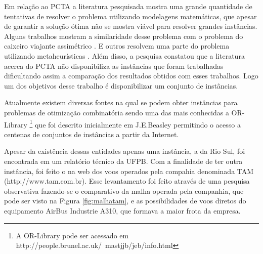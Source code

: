 Em relação ao PCTA a literatura pesquisada \cite{ahmed2009} \cite{arguelo1997}
\cite{cordeau2001} \cite{mohamed2011} \cite{abiliolivro} mostra uma grande quantidade de
tentativas de resolver o problema utilizando modelagens matemáticas, que apesar
de garantir a solução ótima não se mostra viável para resolver grandes
instâncias. Alguns trabalhos mostram a similaridade desse problema com o
problema do caixeiro viajante assimétrico \cite{clarke97}. E outros resolvem
uma parte do problema utilizando metaheurísticas \cite{arguelo1997}. Além disso,
a pesquisa constatou que a literatura acerca do PCTA não disponibiliza as
instâncias que foram trabalhadas dificultando assim a comparação dos
resultados obtidos com esses trabalhos. Logo um dos objetivos desse trabalho é
disponibilizar um conjunto de instâncias.


Atualmente existem diversas fontes na qual se podem obter instâncias para
problemas de otimização combinatória sendo uma das mais conhecidas a
OR-Library \footnote{ A OR-Library pode ser acessado em
http://people.brunel.ac.uk/~mastjjb/jeb/info.html} que foi descrito
inicialmente em J.E.Beasley \cite{orlibrary} permitindo o acesso a centenas de
conjuntos de instâncias a partir da Internet.
  
Apesar da existência dessas entidades apenas uma instância, a da Rio Sul, foi
encontrada em um relatório técnico da UFPB. Com a finalidade de ter outra
instância, foi feito o  na web dos voos operados pela
compahia denominada TAM (http://www.tam.com.br). Esse levantamento foi feito
através de uma pesquisa observativa fazendo-se o comparativo da malha operada
pela companhia, que pode ser visto na Figura \ref{fig:malhatam}, e as
possibilidades de voos diretos do equipamento AirBus Industrie A310, que formava
a maior frota da empresa.
	

